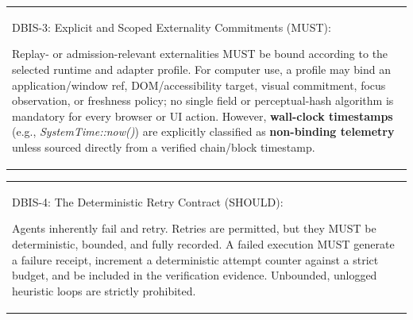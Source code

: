 \documentclass[
  11pt,
]{article}
\begin{document}
\begin{longtable}[]{@{}
  >{\raggedright\arraybackslash}p{}@{}}
\toprule\noalign{}
 \\
\midrule\noalign{}
\endhead
\bottomrule\noalign{}
\endlastfoot
DBIS-3: Explicit and Scoped Externality Commitments (MUST):

Replay- or admission-relevant externalities MUST be bound according to the
selected runtime and adapter profile. For computer use, a profile may bind an
application/window ref, DOM/accessibility target, visual commitment, focus
observation, or freshness policy; no single field or perceptual-hash algorithm
is mandatory for every browser or UI action. However, \textbf{wall-clock
timestamps} (e.g., \emph{SystemTime::now()}) are explicitly classified
as \textbf{non-binding telemetry} unless sourced directly from a
verified chain/block timestamp. \\
\end{longtable}

\begin{longtable}[]{@{}
  >{\raggedright\arraybackslash}p{}@{}}
\toprule\noalign{}
 \\
\midrule\noalign{}
\endhead
\bottomrule\noalign{}
\endlastfoot
DBIS-4: The Deterministic Retry Contract (SHOULD):

Agents inherently fail and retry. Retries are permitted, but they MUST
be deterministic, bounded, and fully recorded. A failed execution MUST
generate a failure receipt, increment a deterministic attempt counter
against a strict budget, and be included in the verification evidence.
Unbounded, unlogged heuristic loops are strictly prohibited. \\
\end{longtable}
\end{document}
